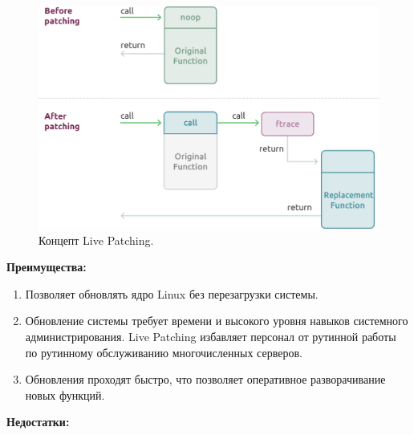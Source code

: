 \begin{figure}[H]
    \centering
    \includegraphics[scale=0.75, width=\textwidth]{inc/img/Livepatch}
    \caption{Концепт Live Patching.}
    \label{fig:Livepatch}
\end{figure}

\textbf{Преимущества:}

\begin{enumerate}
    \item Позволяет обновлять ядро Linux без перезагрузки системы.
    \item Обновление системы требует времени и высокого уровня навыков системного администрирования.
    Live Patching избавляет персонал от рутинной работы по рутинному обслуживанию многочисленных серверов.
    \item Обновления проходят быстро, что позволяет оперативное разворачивание новых функций.
\end{enumerate}

\textbf{Недостатки:}

